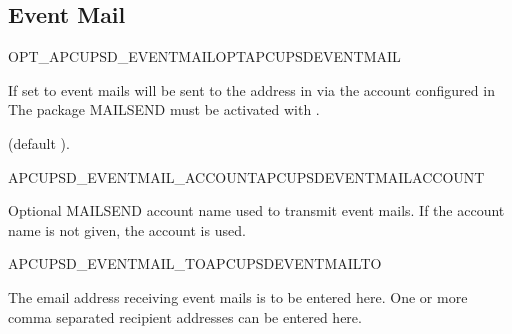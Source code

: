 \subsection{Event Mail}

\begin {description}
 {OPT\_APCUPSD\_EVENTMAIL}{OPTAPCUPSDEVENTMAIL}

  If set to  event mails will be sent to the address in
   via the account 
  configured in   
  The package MAILSEND must be activated with .
  
  (default ). 
  
 {APCUPSD\_EVENTMAIL\_ACCOUNT}{APCUPSDEVENTMAILACCOUNT}

  Optional MAILSEND account name used to transmit event mails.
  If the account name is not given, the account  is used.

 {APCUPSD\_EVENTMAIL\_TO}{APCUPSDEVENTMAILTO}

  The email address receiving event mails is to be entered here.
  One or more comma separated recipient addresses can be entered here.

\end {description}

